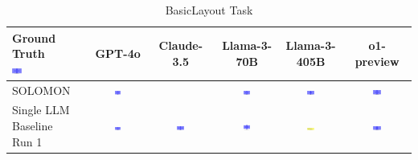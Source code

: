 \begin{table}
  \caption{BasicLayout Task}
  \label{table:basiclayout}
  \centering
  \begin{tabular}{@{}lccccc@{}}
    \toprule
    \makecell{Ground Truth \\ \includegraphics[width=0.13\textwidth]{examples_png/BasicLayout.png}} & GPT-4o & Claude-3.5 & Llama-3-70B & Llama-3-405B & o1-preview \\
    \midrule
    SOLOMON & \includegraphics[width=0.13\textwidth]{./pool_all/png/gpt-4o_results/BasicLayout.png} &  & \includegraphics[width=0.13\textwidth]{./pool_all/png/claude-3-5-sonnet-20240620_results/BasicLayout.png} & \includegraphics[width=0.13\textwidth]{./pool_all/png/watsonx_meta-llama_llama-3-1-70b-instruct_results/BasicLayout.png} & \includegraphics[width=0.13\textwidth]{./pool_all/png/watsonx_meta-llama_llama-3-405b-instruct_results/BasicLayout.png} \\
    \makecell{Single LLM \\ Baseline \\ Run 1} & \includegraphics[width=0.13\textwidth]{./run_1/png/gpt-4o_results/BasicLayout.png} & \includegraphics[width=0.13\textwidth]{./run_1/png/o1-preview_results/BasicLayout.png} & \includegraphics[width=0.13\textwidth]{./run_1/png/claude-3-5-sonnet-20240620_results/BasicLayout.png} & \includegraphics[width=0.13\textwidth]{./run_1/png/watsonx_meta-llama_llama-3-1-70b-instruct_results/BasicLayout.png} & \includegraphics[width=0.13\textwidth]{./run_1/png/watsonx_meta-llama_llama-3-405b-instruct_results/BasicLayout.png} \\

\end{tabular}
\end{table}
